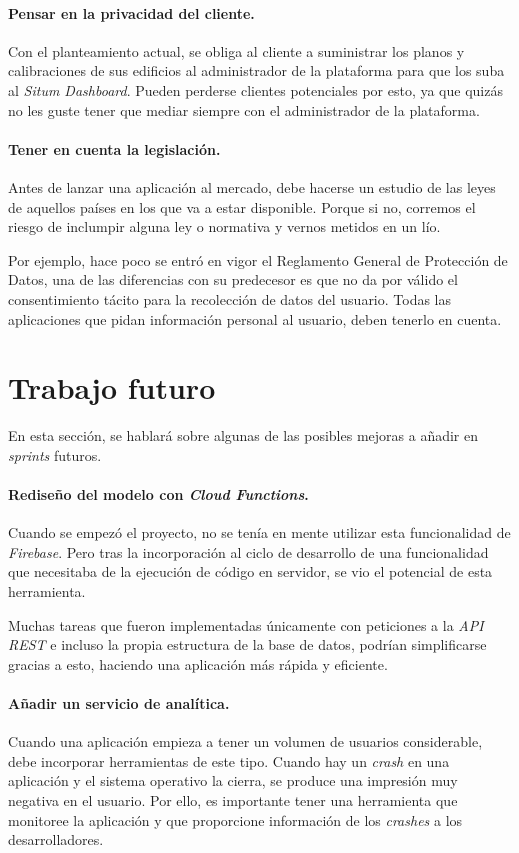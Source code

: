 \paragraph{Pensar en la privacidad del cliente.}
Con el planteamiento actual, se obliga al cliente a suministrar los planos y calibraciones de sus edificios al administrador de la plataforma para que los suba al \textit{Situm Dashboard}. Pueden perderse clientes potenciales por esto, ya que quizás no les guste tener que mediar siempre con el administrador de la plataforma.

\paragraph{Tener en cuenta la legislación.}
Antes de lanzar una aplicación al mercado, debe hacerse un estudio de las leyes de aquellos países en los que va a estar disponible. Porque si no, corremos el riesgo de inclumpir alguna ley o normativa y vernos metidos en un lío.

Por ejemplo, hace poco se entró en vigor el Reglamento General de Protección de Datos, una de las diferencias con su predecesor es que no da por válido el consentimiento tácito para la recolección de datos del usuario. Todas las aplicaciones que pidan información personal al usuario, deben tenerlo en cuenta.

\section{Trabajo futuro}
En esta sección, se hablará sobre algunas de las posibles mejoras a añadir en \textit{sprints} futuros.

\paragraph{Rediseño del modelo con \textit{Cloud Functions}.}
Cuando se empezó el proyecto, no se tenía en mente utilizar esta funcionalidad de \textit{Firebase}. Pero tras la incorporación al ciclo de desarrollo de una funcionalidad que necesitaba de la ejecución de código en servidor, se vio el potencial de esta herramienta.

Muchas tareas que fueron implementadas únicamente con peticiones a la \textit{API REST} e incluso la propia estructura de la base de datos, podrían simplificarse gracias a esto, haciendo una aplicación más rápida y eficiente.

\paragraph{Añadir un servicio de analítica.}
Cuando una aplicación empieza a tener un volumen de usuarios considerable, debe incorporar herramientas de este tipo. Cuando hay un \textit{crash} en una aplicación y el sistema operativo la cierra, se produce una impresión muy negativa en el usuario. Por ello, es importante tener una herramienta que monitoree la aplicación y que proporcione información de los \textit{crashes} a los desarrolladores.

